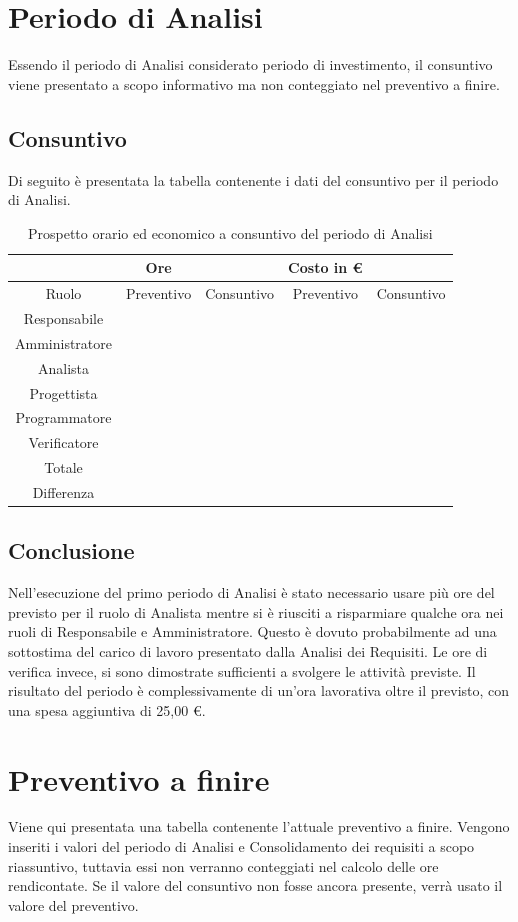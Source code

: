 \documentclass[./PianodiProgetto.tex]{subfiles}
\begin{document}
\section{Periodo di Analisi}
Essendo il periodo di Analisi considerato periodo di investimento, il consuntivo viene presentato a scopo informativo ma non conteggiato nel preventivo a finire.
\subsection{Consuntivo}
Di seguito è presentata la tabella contenente i dati del consuntivo per il
periodo di Analisi.

\begin{table}[H]
	\centering
	\begin{tabular}{|c|c|c|c|c|}
		\hline
	 	 &Ore& &Costo in €&  \\ \hline
		Ruolo&Preventivo&Consuntivo&Preventivo&Consuntivo \\ \hline
		Responsabile& & & &  \\ \hline
		Amministratore& & & &  \\ \hline
		Analista& & & &  \\ \hline
		Progettista& & & &  \\ \hline
		Programmatore& & & &  \\ \hline
		Verificatore& & & &  \\ \hline
		Totale& & & &  \\ \hline
		Differenza& & & &  \\ \hline
	\end{tabular}
	\caption{Prospetto orario ed economico a consuntivo del periodo di Analisi}
\end{table}

\subsection{Conclusione}
Nell'esecuzione del primo periodo di Analisi è stato necessario usare più
ore del previsto per il ruolo di Analista mentre si è riusciti a risparmiare
qualche ora nei ruoli di Responsabile e Amministratore. Questo è dovuto
probabilmente ad una sottostima del carico di lavoro presentato dalla Analisi
dei Requisiti. Le ore di verifica invece, si sono dimostrate sufficienti a svolgere
le attività previste. Il risultato del periodo è complessivamente di un'ora
lavorativa oltre il previsto, con una spesa aggiuntiva di 25,00 €.
\section{Preventivo a finire}
Viene qui presentata una tabella contenente l'attuale preventivo a finire.
Vengono inseriti i valori del periodo di Analisi e Consolidamento dei requisiti
a scopo riassuntivo, tuttavia essi non verranno conteggiati nel calcolo delle
ore rendicontate. Se il valore del consuntivo non fosse ancora presente, verrà
usato il valore del preventivo.
\end{document}
